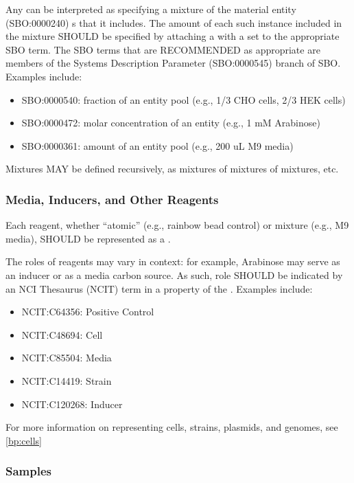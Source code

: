 Any  can be interpreted as specifying a mixture of the material entity (SBO:0000240) s that it includes.  The amount of each such instance included in the mixture SHOULD be specified by attaching a  with a  set to the appropriate SBO term. The SBO terms that are RECOMMENDED as appropriate are members of the Systems Description Parameter (SBO:0000545) branch of SBO. Examples include:
\begin{itemize}
\item SBO:0000540: fraction of an entity pool (e.g., 1/3 CHO cells, 2/3 HEK cells)
\item SBO:0000472: molar concentration of an entity (e.g., 1 mM Arabinose)
\item SBO:0000361: amount of an entity pool (e.g., 200 uL M9 media)
\end{itemize}

Mixtures MAY be defined recursively, as mixtures of mixtures of mixtures, etc.

\subsubsection{Media, Inducers, and Other Reagents}

Each reagent, whether ``atomic'' (e.g., rainbow bead control) or mixture (e.g., M9 media), SHOULD be represented as a .

The roles of reagents may vary in context: for example, Arabinose may serve as an inducer or as a media carbon source. As such, role SHOULD be indicated by an NCI Thesaurus (NCIT) term in a  property of the . Examples include:
\begin{itemize}
\item NCIT:C64356: Positive Control
\item NCIT:C48694: Cell
\item NCIT:C85504: Media
\item NCIT:C14419: Strain
\item NCIT:C120268: Inducer
\end{itemize}

For more information on representing cells, strains, plasmids, and genomes, see \ref{bp:cells}


\subsubsection{Samples}

